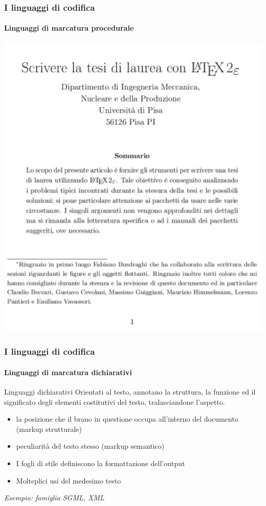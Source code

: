 \documentclass{beamer}
\begin{document}
\begin{frame}
	\frametitle{I linguaggi di codifica}
	\framesubtitle{Linguaggi di marcatura procedurale}
	\addtocounter{nframe}{1}

	\begin{center}
		\includegraphics[width=.8\textwidth]{imgs/LatexDoc.jpg}
	\end{center}

\end{frame}

\begin{frame}
	\frametitle{I linguaggi di codifica}
	\framesubtitle{Linguaggi di marcatura dichiarativi}
	\addtocounter{nframe}{1}

	\begin{block}{Linguaggi dichiarativi}
		Orientati al testo, annotano la struttura, la funzione ed il significato degli elementi costitutivi
		del testo, tralasciandone l’aspetto.
		\begin{itemize}
			\item la posizione che il brano in questione occupa all’interno del documento (markup strutturale)
			\item peculiarità del testo stesso (markup semantico)
			\item I fogli di stile definiscono la formattazione dell’output
			\item Molteplici usi del medesimo testo
		\end{itemize}
	\end{block}
	\textit{Esempio: famiglia SGML, XML}
\end{frame}
\end{document}
